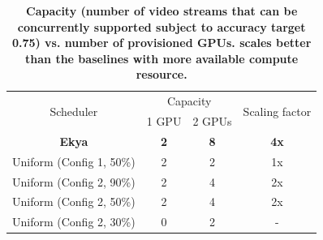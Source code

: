 \begin{table}
\footnotesize
\begin{tabular}{cccc}
\hline
\multirow{2}{*}{Scheduler} & \multicolumn{2}{c}{Capacity} & \multirow{2}{*}{Scaling factor} \\ \cline{2-3}
& 1 GPU & 2 GPUs &  \\ \hline
\textbf{Ekya} & \textbf{2} & \textbf{8} & \textbf{4x} \\ \hline
Uniform (Config 1, 50\%) & 2 & 2 & 1x \\ \hline
Uniform (Config 2, 90\%) & 2 & 4 & 2x \\ \hline
Uniform (Config 2, 50\%) & 2 & 4 & 2x \\ \hline
Uniform (Config 2, 30\%) & 0 & 2 & - \\ \hline
\end{tabular}
\caption{\small \bf Capacity (number of video streams that can be concurrently supported subject to accuracy target 0.75) vs. number of provisioned GPUs.
\name scales better than the \fair baselines with more available compute resource.
}
\label{tab:scalability-gpu-vs-cam-thresholded}
\end{table}





